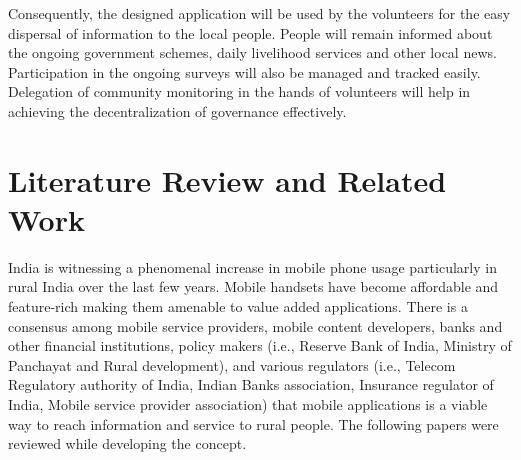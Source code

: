 
Consequently, the designed application will be used by the volunteers for the easy dispersal of information to the local people. People will remain informed about the ongoing government schemes, daily livelihood services and other local news. Participation in the ongoing surveys will also be managed and tracked easily. Delegation of community monitoring in the hands of volunteers will help in achieving the decentralization of governance effectively. 

\section{Literature Review and Related Work}
India is witnessing a phenomenal increase in mobile phone usage particularly in rural India over the last few years. Mobile handsets have become affordable and feature-rich making them amenable to value added applications. There is a consensus among mobile service providers, mobile content developers, banks and other financial institutions, policy makers (i.e., Reserve Bank of India, Ministry of Panchayat and Rural development), and various regulators (i.e., Telecom Regulatory authority of India, Indian Banks association, Insurance regulator of India, Mobile service provider association) that mobile applications is a viable way to reach information and service to rural people. The following papers were reviewed while developing the concept.

